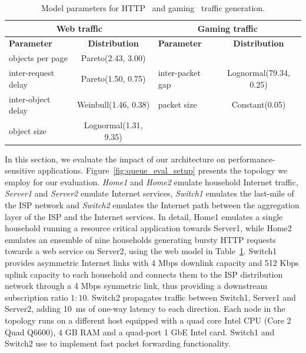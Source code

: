 \begin{table}
    {\small
  \begin{tabular} {|l|c|l|c|}
    \hline
    \multicolumn{2}{|c|}{\textbf{Web traffic}} & \multicolumn{2}{|c|}{\textbf{Gaming traffic}} \\
    \hline
    \textbf{Parameter} & \textbf{Distribution} & \textbf{Parameter} & \textbf{Distribution} \\
    \hline
    objects per page    & Pareto(2.43, 3.00)       &                  &                       \\
    inter-request delay & Pareto(1.50, 0.75)       & inter-packet gap & Lognormal(79.34, 0.25)\\
    inter-object delay  & Weinbull(1.46, 0.38)     & packet size      & Constant(0.05)        \\
    object size         & Lognormal(1.31, 9.35)    &                  &                        \\
    
    \hline
  \end{tabular} 
 } \caption{\label{t:homework:performance-web-model}Model parameters for HTTP~ and
    gaming~ traffic generation.}
\end{table}


In this section, we evaluate the impact of our architecture on
performance-sensitive applications.  Figure~\ref{fig:queue_eval_setup} presents
the topology we employ for our evaluation.  \textit{Home1} and \textit{Home2}
emulate household Internet traffic,  \textit{Server1} and \textit{Server2}
emulate Internet services,  \textit{Switch1} emulates the last-mile of the ISP
network and \textit{Switch2} emulates the Internet path between the aggregation
layer of the ISP and the Internet services. In detail, Home1 emulates a single
household running a resource critical application towards Server1, while Home2
emulates an ensemble of nine households generating bursty HTTP requests towards a
web service on Server2, using the web model in
Table~\ref{t:homework:performance-web-model}.  Switch1 provides asymmetric
Internet links with 4 Mbps downlink capacity and  512 Kbps uplink capacity to
each household and  connects them to the ISP distribution network through a 4
Mbps symmetric link, thus providing a downstream subscription ratio $1:10$.
Switch2 propagates traffic between Switch1, Server1 and Server2, adding 10~ms
of one-way latency to each direction. Each node in the  topology runs on a
different host equipped with a quad core Intel CPU (Core 2 Quad Q6600), 4 GB
RAM and a quad-port 1 GbE Intel card. Switch1 and Switch2 use \ovs to implement
fast packet forwarding functionality.

